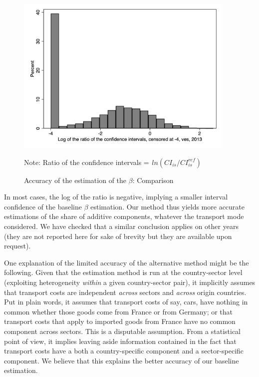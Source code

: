 \documentclass[11pt,twoside, authoryear]{elsarticle}
\begin{document}
\begin{itemize}
	
	\begin{figure}[htbp]
		\caption{Accuracy of the estimation of the $\beta$: Comparison}
		\label{fig:accuracy_beta}
		\begin{center}
			\includegraphics[height=3in]{../../revised_article/comparaison_amplitude_baseline_referee1_2013_ves.png}
			\begin{minipage} [c]  {5in} \scriptsize%
				Note: Ratio of the confidence intervals = $ _{}ln(CI_{is}/CI^{ref}_{is})$
			\end{minipage}
			
		\end{center}
	\end{figure}
	
In most cases, the log of the ratio is negative, implying a smaller interval confidence of the baseline $\beta$ estimation. Our method thus yields more accurate estimations of the share of additive components, whatever the transport mode considered. We have checked that a similar conclusion applies on other years (they are not reported here for sake of brevity but they are available upon request).
\end{itemize}

One explanation of the limited accuracy of the alternative method might be the following. Given that the estimation method is run at the country-sector level (exploiting heterogeneity \textit{within} a given country-sector pair), it implicitly assumes that transport costs are independent \textit{across} sectors and \textit{across} origin countries. Put in plain words, it assumes that transport costs of say, cars, have nothing in common whether those goods come from France or from Germany; or that transport costs that apply to imported goods from France have no common component across sectors. This is a disputable assumption. From a statistical point of view, it implies leaving aside information contained in the fact that transport costs have a both a country-specific component and a sector-specific component. We believe that this explains the better accuracy of our baseline estimation.
\end{document}
